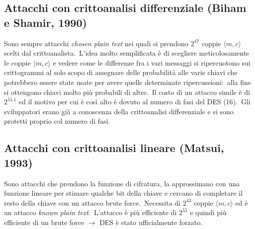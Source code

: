 \subsection{Attacchi con crittoanalisi differenziale (Biham e Shamir, 1990)}

Sono sempre attacchi \textit{chosen plain text} nei quali si prendono $2^{47}$ coppie $\langle m, c\rangle$ scelti dal crittoanalista.\
L'idea molto semplificata è di scegliere meticolosamente le coppie $\langle m, c\rangle$ e vedere come le differenze fra i vari messaggi si ripercuotono sui crittogrammi al solo scopo di assegnare delle probabilità alle varie chiavi che potrebbero essere state usate per avere quelle determinate ripercussioni:\ alla fine si ottengono chiavi molto più probabili di altre.\
Il costo di un attacco simile è di $2^{55.1}$ ed il motivo per cui è così alto è dovuto al numero di fasi del DES (16).\
Gli sviluppatori erano già a conoscenza della crittoanalisi differenziale e si sono protetti proprio col numero di fasi.

\subsection{Attacchi con crittoanalisi lineare (Matsui, 1993)}

Sono attacchi che prendono la funzione di cifratura, la approssimano con una funzione lineare per stimare qualche bit della chiave e cercano di completare il resto della chiave con un attacco brute force.\
Necessita di $2^{43}$ coppie $\langle m, c\rangle$ ed è un attacco \textit{known plain text}.\
L'attacco è più efficiente di $2^{55}$ e quindi più efficiente di un brute force $\rightarrow$ DES è stato ufficialmente forzato.\
